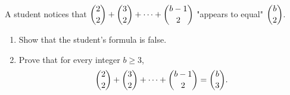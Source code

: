 A student notices that $\dbinom22+\dbinom32+\cdots+\dbinom{b-1}{2}$ "appears to equal" $\dbinom b2$.
\begin{enumerate}
\item[(a)] Show that the student's formula is false.
\item[(b)] Prove that for every integer $b\ge3$,
\[
\dbinom22+\dbinom32+\cdots+\dbinom{b-1}{2}=\dbinom b3 .
\]
\end{enumerate}
